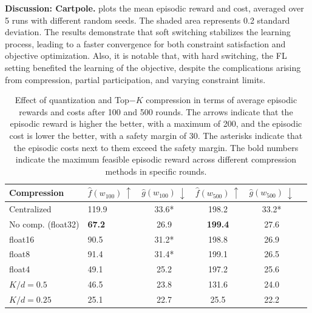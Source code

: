 \documentclass{article} %
\begin{document}
\textbf{Discussion: Cartpole.}
 plots the mean episodic reward and cost, averaged over 5 runs with different random seeds. The shaded area represents 0.2 standard deviation. The results demonstrate that soft switching stabilizes the learning process, leading to a faster convergence for both constraint satisfaction and objective optimization. Also, it is notable that, with hard switching, the FL setting benefited the learning of the objective, despite the complications arising from compression, partial participation, and varying constraint limits. 
\begin{table}
\vspace{-2mm}
\caption{Effect of quantization and Top$-K$ compression in terms of average episodic rewards and costs after 100 and 500 rounds. The arrows indicate that the episodic reward is higher the better, with a maximum of 200, and the episodic cost is lower the better, with a safety margin of 30. The asterisks indicate that the episodic costs next to them exceed the safety margin. The bold numbers indicate the maximum feasible episodic reward across different compression methods in specific rounds.}
\vspace{-1mm}
\label{tab:compression_cartpole}
\centering
\begin{tabular}{llcccc} 
\toprule
Compression & $\hat{f}(w_{100})\ \uparrow$ & $\hat{g}(w_{100})\ \downarrow$ & $\hat{f}(w_{500})\ \uparrow$ & $\hat{g}(w_{500})\ \downarrow$ \\
\midrule
Centralized & 119.9 & 33.6* & 198.2 & 33.2* \\
No comp. (float32) & \textbf{67.2} & 26.9 & \textbf{199.4} & 27.6 \\
float16 & 90.5 & 31.2* & 198.8 & 26.9 \\
float8 & 91.4 & 31.4* & 199.1 & 26.5 \\
float4 & 49.1 & 25.2 & 197.2 & 25.6 \\
$K/d=0.5$ & 46.5 & 23.8 & 131.6 & 24.0 \\ 
$K/d=0.25$ & 25.1 & 22.7 & 25.5 & 22.2 \\ 
\bottomrule
\end{tabular}
\end{table}
\end{document}
